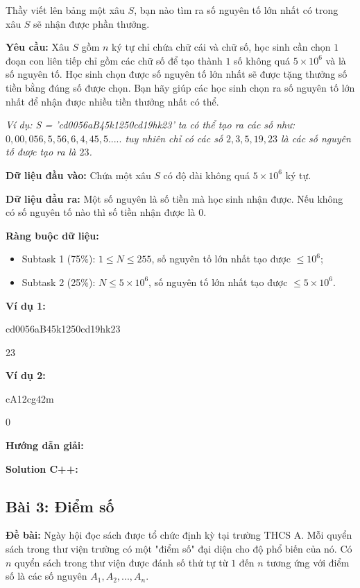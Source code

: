 \documentclass[12pt]{scrartcl}  %
\begin{document}
Thầy viết lên bảng một xâu $S$, bạn nào tìm ra số nguyên tố lớn nhất có trong xâu $S$ sẽ nhận được phần thưởng.

\textbf{Yêu cầu:}
Xâu $S$ gồm $n$ ký tự chỉ chứa chữ cái và chữ số, học sinh cần chọn $1$ đoạn con liên tiếp chỉ gồm các chữ số để tạo
thành $1$ số không quá $5 \times 10^6$ và là số nguyên tố. Học sinh chọn được số nguyên tố lớn nhất sẽ được tặng thưởng
số tiền bằng đúng số được chọn. Bạn hãy giúp các học sinh chọn ra số nguyên tố lớn nhất để nhận được nhiều tiền thưởng nhất có thể.

\textit{Ví dụ: S = 'cd0056aB45k1250cd19hk23' ta có thể tạo ra các số như: $0, 00, 056, 5, 56, 6, 4, 45, 5.....$ tuy nhiên chỉ có các số $2, 3, 5, 19, 23$ là các số nguyên tố được tạo ra là $23$.}

\textbf{Dữ liệu đầu vào:}
Chứa một xâu $S$ có độ dài không quá $5 \times 10^6$ ký tự.

\textbf{Dữ liệu đầu ra:}
Một số nguyên là số tiền mà học sinh nhận được.
Nếu không có số nguyên tố nào thì số tiền nhận được là 0.

\textbf{Ràng buộc dữ liệu:}
\begin{itemize}
    \item Subtask 1 (75\%): $1 \leq N \leq 255$, số nguyên tố lớn nhất tạo được $\leq 10^6$;
    \item Subtask 2 (25\%): $N \leq 5 \times 10^6$, số nguyên tố lớn nhất tạo được $\leq 5 \times 10^6$.
\end{itemize}

\textbf{Ví dụ 1:}
\begin{tcolorbox}[colback=gray!5!white, colframe=blue!50!black, title=Input]
cd0056aB45k1250cd19hk23
\end{tcolorbox}
\begin{tcolorbox}[colback=gray!5!white, colframe=green!50!black, title=Output]
23
\end{tcolorbox}

\textbf{Ví dụ 2:}
\begin{tcolorbox}[colback=gray!5!white, colframe=blue!50!black, title=Input]
cA12cg42m
\end{tcolorbox}
\begin{tcolorbox}[colback=gray!5!white, colframe=green!50!black, title=Output]
0
\end{tcolorbox}

\textbf{Hướng dẫn giải:}

\textbf{Solution C++:}

\subsection{Bài 3: Điểm số}
\textbf{Đề bài:}
Ngày hội đọc sách được tổ chức định kỳ tại trường THCS A. Mỗi quyển sách trong thư viện trường có một "điểm số" đại diện cho độ phổ biến của nó. Có $n$ quyển sách trong thư viện được đánh số thứ tự từ $1$ đến $n$ tương ứng với điểm số là các số nguyên $A_1, A_2, ... , A_n$.
\end{document}
